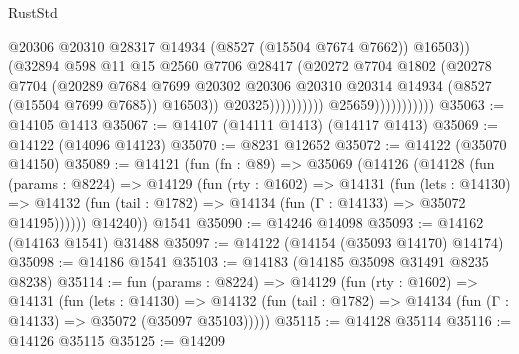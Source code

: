 \begin{lexlean}{RustStd}
\begin{coremodule}
                                              @20306
                                              @20310
                                              @28317
                                              @14934
                                              (@8527 (@15504 @7674 @7662))
                                              @16503))
                                          (@32894
                                            @598
                                            @11
                                            @15
                                            @2560
                                            @7706
                                            @28417
                                            (@20272
                                              @7704
                                              @1802
                                              (@20278
                                                @7704
                                                (@20289
                                                  @7684
                                                  @7699
                                                  @20302
                                                  @20306
                                                  @20310
                                                  @20314
                                                  @14934
                                                  (@8527 (@15504 @7699 @7685))
                                                  @16503))
                                              @20325))))))))))
                          @25659)))))))))))
@35063 := @14105 @1413
@35067 := @14107 (@14111 @1413) (@14117 @1413)
@35069 := @14122 (@14096 @14123)
@35070 := @8231 @12652
@35072 := @14122 (@35070 @14150)
@35089 := @14121
    (fun (fn : @89) =>
    @35069
      (@14126
        (@14128
          (fun (params : @8224) =>
          @14129
            (fun (rty : @1602) =>
            @14131
              (fun (lets : @14130) =>
              @14132 (fun (tail : @1782) => @14134 (fun (Γ : @14133) => @35072 @14195))))))
        @14240))
    @1541
@35090 := @14246 @14098
@35093 := @14162 (@14163 @1541) @31488
@35097 := @14122 (@14154 (@35093 @14170) @14174)
@35098 := @14186 @1541
@35103 := @14183 (@14185 @35098 @31491 @8235 @8238)
@35114 := fun (params : @8224) =>
  @14129
    (fun (rty : @1602) =>
    @14131
      (fun (lets : @14130) =>
      @14132 (fun (tail : @1782) => @14134 (fun (Γ : @14133) => @35072 (@35097 @35103)))))
@35115 := @14128 @35114
@35116 := @14126 @35115
@35125 := @14209

\end{coremodule}
\end{lexlean}
